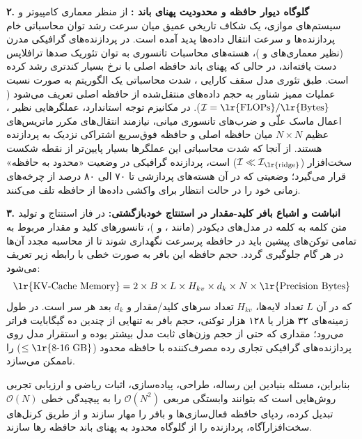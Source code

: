 \documentclass[12pt,a4paper]{report}
\theoremstyle{definition}
\begin{document}
\textbf{۲. گلوگاه دیوار حافظه  و محدودیت پهنای باند :}
از منظر معماری کامپیوتر و سیستم‌های موازی، یک شکاف تاریخی عمیق میان سرعت رشد توان محاسباتی خام پردازنده‌ها و سرعت انتقال داده‌ها پدید آمده است. در پردازنده‌های گرافیکی مدرن (نظیر معماری‌های  و )، هسته‌های محاسبات تانسوری  به توان تئوریک صدها ترافلاپس دست یافته‌اند، در حالی که پهنای باند حافظه اصلی  با نرخ بسیار کندتری رشد کرده است. طبق تئوری مدل سقف کارایی  \cite{williams2009roofline}، شدت محاسباتی  یک الگوریتم به صورت نسبت عملیات ممیز شناور به حجم داده‌های منتقل‌شده از حافظه اصلی تعریف می‌شود ($\mathcal{I} = \text{\lr{FLOPs}} / \text{\lr{Bytes}}$). در مکانیزم توجه استاندارد، عملگرهایی نظیر ، اعمال ماسک علّی و ضرب‌های تانسوری میانی، نیازمند انتقال‌های مکرر ماتریس‌های عظیم $N \times N$ میان حافظه اصلی  و حافظه فوق‌سریع اشتراکی نزدیک به پردازنده  هستند. از آنجا که شدت محاسباتی این عملگرها بسیار پایین‌تر از نقطه شکست سخت‌افزار ($\mathcal{I} \ll \mathcal{I}_{\text{\lr{ridge}}}$) است، پردازنده گرافیکی در وضعیت «محدود به حافظه»  قرار می‌گیرد؛ وضعیتی که در آن هسته‌های پردازشی تا ۷۰ الی ۸۰ درصد از چرخه‌های زمانی خود را در حالت انتظار برای واکشی داده‌ها از حافظه تلف می‌کنند.

\textbf{۳. انباشت و اشباع بافر کلید-مقدار  در استنتاج خودبازگشتی:}
در فاز استنتاج و تولید متن کلمه به کلمه در مدل‌های دیکودر (مانند  \cite{radford2019language}،  \cite{touvron2023llama} و  \cite{bai2023qwen})، تانسورهای کلید و مقدار مربوط به تمامی توکن‌های پیشین باید در حافظه پرسرعت  نگهداری شوند تا از محاسبه مجدد آن‌ها در هر گام جلوگیری گردد. حجم حافظه این بافر به صورت خطی با رابطه زیر تعریف می‌شود:
\begin{equation}
\text{\lr{KV-Cache Memory}} = 2 \times B \times L \times H_{kv} \times d_k \times N \times \text{\lr{Precision Bytes}}
\end{equation}
که در آن $L$ تعداد لایه‌ها، $H_{kv}$ تعداد سرهای کلید/مقدار و $d_k$ بعد هر سر است. در طول زمینه‌های ۳۲ هزار یا ۱۲۸ هزار توکنی، حجم بافر  به تنهایی از چندین ده گیگابایت فراتر می‌رود؛ مقداری که حتی از حجم وزن‌های ثابت مدل بیشتر بوده و استقرار مدل روی پردازنده‌های گرافیکی تجاری رده مصرف‌کننده با حافظه محدود ($\le \text{\lr{8-16 GB}}$) را ناممکن می‌سازد.

بنابراین، مسئله بنیادین این رساله، طراحی، پیاده‌سازی، اثبات ریاضی و ارزیابی تجربی روش‌هایی است که بتوانند وابستگی مربعی $\mathcal{O}(N^2)$ را به پیچیدگی خطی $\mathcal{O}(N)$ تبدیل کرده، ردپای حافظه فعال‌سازی‌ها و بافر  را مهار سازند و از طریق کرنل‌های سخت‌افزارآگاه، پردازنده را از گلوگاه محدود به پهنای باند حافظه رها سازند.
\end{document}
